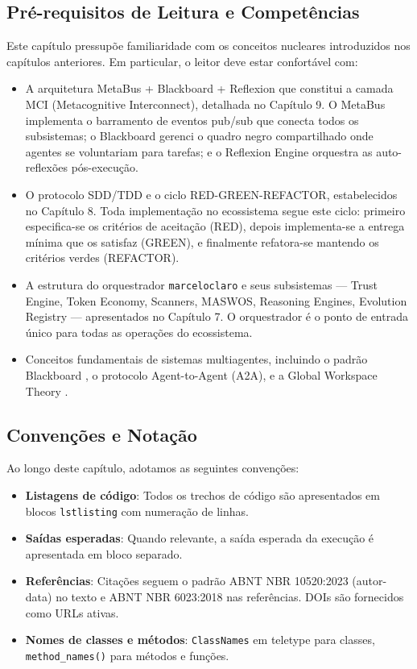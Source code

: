 \subsection{Pré-requisitos de Leitura e Competências}
\label{sec:prereqs}

Este capítulo pressupõe familiaridade com os conceitos nucleares introduzidos nos capítulos anteriores. Em particular, o leitor deve estar confortável com:

\begin{itemize}
  \item A arquitetura MetaBus + Blackboard + Reflexion que constitui a camada MCI (Metacognitive Interconnect), detalhada no Capítulo 9. O MetaBus implementa o barramento de eventos pub/sub que conecta todos os subsistemas; o Blackboard gerenci o quadro negro compartilhado onde agentes se voluntariam para tarefas; e o Reflexion Engine orquestra as auto-reflexões pós-execução.
  \item O protocolo SDD/TDD e o ciclo RED-GREEN-REFACTOR, estabelecidos no Capítulo 8. Toda implementação no ecossistema segue este ciclo: primeiro especifica-se os critérios de aceitação (RED), depois implementa-se a entrega mínima que os satisfaz (GREEN), e finalmente refatora-se mantendo os critérios verdes (REFACTOR).
  \item A estrutura do orquestrador \texttt{marceloclaro} e seus subsistemas — Trust Engine, Token Economy, Scanners, MASWOS, Reasoning Engines, Evolution Registry — apresentados no Capítulo 7. O orquestrador é o ponto de entrada único para todas as operações do ecossistema.
  \item Conceitos fundamentais de sistemas multiagentes, incluindo o padrão Blackboard \citep{guo2025blackboard}, o protocolo Agent-to-Agent (A2A), e a Global Workspace Theory \citep{baars1997global}.
\end{itemize}

\subsection{Convenções e Notação}
\label{sec:convencoes}

Ao longo deste capítulo, adotamos as seguintes convenções:

\begin{itemize}
  \item \textbf{Listagens de código}: Todos os trechos de código são apresentados em blocos \texttt{lstlisting} com numeração de linhas.
  \item \textbf{Saídas esperadas}: Quando relevante, a saída esperada da execução é apresentada em bloco separado.
  \item \textbf{Referências}: Citações seguem o padrão ABNT NBR 10520:2023 (autor-data) no texto e ABNT NBR 6023:2018 nas referências. DOIs são fornecidos como URLs ativas.
  \item \textbf{Nomes de classes e métodos}: \texttt{ClassNames} em teletype para classes, \texttt{method\_names()} para métodos e funções.
\end{itemize}

